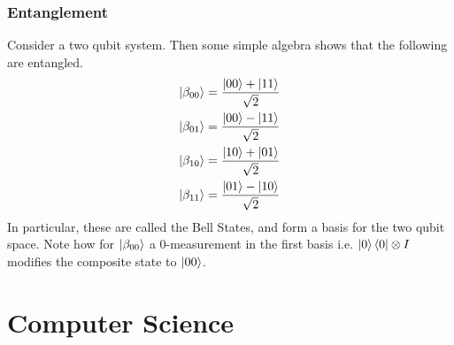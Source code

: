 \documentclass{beamer}
\begin{document}
    \begin{frame}
        \frametitle{Entanglement}
        \begin{example}
        Consider a two qubit system. Then some simple algebra shows that the following are entangled.
        \begin{align}
            \label{Bell states}
            \ket{\beta_{00}} &= \frac{\ket{00} + \ket{11}}{\sqrt{2}} \\
            \ket{\beta_{01}} &= \frac{\ket{00} - \ket{11}}{\sqrt{2}} \\
            \ket{\beta_{10}} &= \frac{\ket{10} + \ket{01}}{\sqrt{2}} \\
            \ket{\beta_{11}} &= \frac{\ket{01} - \ket{10}}{\sqrt{2}} 
        \end{align}
        In particular, these are called the Bell States, and form a basis for the two qubit space. 
        Note how for $\ket{\beta_{00}}$ a 0-measurement in the first basis i.e. $\ket{0}\bra{0} \otimes I$
        modifies the composite state to $\ket{00}$.
        \end{example}
    \end{frame}
    \section{Computer Science}
\end{document}
